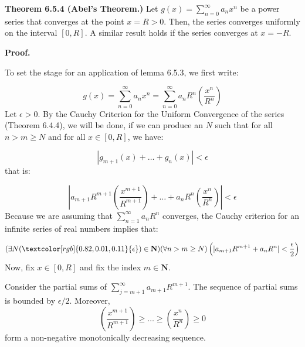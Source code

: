 \documentclass[10pt]{article}
\begin{document}
\textbf{Theorem 6.5.4 (Abel's Theorem.) }Let $\displaystyle g( x) =\sum _{n=0}^{\infty } a_{n} x^{n}$ be a power series that converges at the point $\displaystyle x=R >0$. Then, the series converges uniformly on the interval $\displaystyle [ 0,R]$. A similar result holds if the series converges at $\displaystyle x=-R$.



\textbf{Proof.}



To set the stage for an application of lemma 6.5.3, we first write:


\begin{equation*}
g( x) =\sum _{n=0}^{\infty } a_{n} x^{n} =\sum _{n=0}^{\infty } a_{n} R^{n}\left(\frac{x^{n}}{R^{n}}\right)
\end{equation*}
Let $\displaystyle \epsilon  >0$. By the Cauchy Criterion for the Uniform Convergence of the series (Theorem 6.4.4), we will be done, if we can produce an $\displaystyle N$ such that for all $\displaystyle n >m\geq N$ and for all $\displaystyle x\in [ 0,R]$, we have:


\begin{equation*}
|g_{m+1}( x) +\dotsc +g_{n}( x) |< \epsilon 
\end{equation*}
that is:


\begin{equation}
\left| a_{m+1} R^{m+1}\left(\frac{x^{m+1}}{R^{m+1}}\right) +\dotsc +a_{n} R^{n}\left(\frac{x^{n}}{R^{n}}\right)\right| < \epsilon 
\end{equation}
Because we are assuming that $\displaystyle \sum _{n=1}^{\infty } a_{n} R^{n}$ converges, the Cauchy criterion for an infinite series of real numbers implies that:


\begin{equation*}
( \exists N(\textcolor[rgb]{0.82,0.01,0.11}{\epsilon }) \in \mathbf{N})( \forall n >m\geq N)\left( |a_{m+1} R^{m+1} +a_{n} R^{n} |< \frac{\epsilon }{2}\right)
\end{equation*}
Now, fix $\displaystyle x\in [ 0,R]$ and fix the index $\displaystyle m\in \mathbf{N}$. 

Consider the partial sums of $\displaystyle \sum _{j=m+1}^{\infty } a_{m+1} R^{m+1}$. The sequence of partial sums is bounded by $\displaystyle \epsilon /2$. Moreover, 
\begin{equation*}
\left(\frac{x^{m+1}}{R^{m+1}}\right) \geq \dotsc \geq \left(\frac{x^{n}}{R^{n}}\right) \geq 0
\end{equation*}
form a non-negative monotonically decreasing sequence. 
\end{document}
